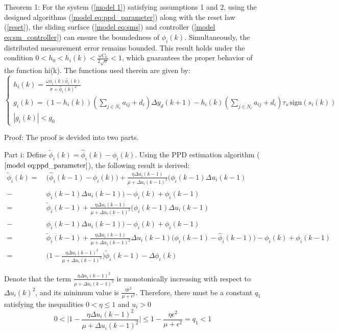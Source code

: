 \documentclass[journal,onecolumn]{IEEEtran}
\begin{document}
Theorem 1: For the system (\ref{model 1}) satisfying assumptions 1 and 2, using  the designed algorithms (\ref{model eq:ppd_parameter}) along with the reset law (\ref{reset}), the sliding surface (\ref{model eq:sms}) and controller (\ref{model eq:sm_controller}) can ensure the boundedness of $ \hat{\phi}_i(k) $. Simultaneously, the distributed measurement error remains bounded. This result holds under the condition $ 0<h_0<h_i(k)<\frac{\omega C_0}{2 \sqrt{\sigma}} <1  $, which guarantees the proper behavior of the function hi(k). The functions used therein are given by: 
\[
\begin{cases} 
    h_i(k) = \frac{\omega \phi_i(k) \hat{\phi}_i(k)}{\sigma + \hat{\phi}_i(k)^2} \\
    g_i(k) = (1 - h_i(k))\left( \sum_{j \in N_i} a_{ij} + d_i \right)\Delta y_d(k+1) - h_i(k)\left( \sum_{j \in N_i} a_{ij} + d_i \right)\tau_s\, \text{sign}(s_i(k)) \\
    |g_i(k)| < g_0
\end{cases}
\]

Proof: The proof is devided into two parts.

Part i: Define $\tilde{\phi}_i(k) = \hat{\phi}_i(k) - \phi_i(k)$. Using the PPD estimation algorithm ($\ref{model eq:ppd_parameter}$), the following result is derived:
\begin{align}
    \label{model:phi_tilde_update}
    \tilde{\phi}_i(k) = \ & \big( \hat{\phi}_i(k-1) - \phi_i(k) \big) + \frac{\eta \Delta u_i(k-1)}{\mu + \Delta u_i(k-1)^2} \big( \phi_i(k-1) \Delta u_i(k-1) \quad \nonumber \\
    - \ & \hat{\phi}_i(k-1) \Delta u_i(k-1)\big) - \phi_i(k) + \phi_i(k-1) \quad \nonumber \\
    = \ & \tilde{\phi}_i(k-1) + \frac{\eta \Delta u_i(k-1)}{\mu + \Delta u_i(k-1)^2} \big( \phi_i(k-1) \Delta u_i(k-1) \quad \nonumber \\
    - \ & \hat{\phi}_i(k-1) \Delta u_i(k-1)\big) - \phi_i(k) + \phi_i(k-1) \quad \nonumber \\
    = \ & \tilde{\phi}_i(k-1) + \frac{\eta \Delta u_i(k-1)}{\mu + \Delta u_i(k-1)^2} \Delta u_i(k-1) \big( \phi_i(k-1) - \hat{\phi}_i(k-1) \big) - \phi_i(k) + \phi_i(k-1) \quad \nonumber \\
    = \ & \bigg( 1 - \frac{\eta \Delta u_i(k-1)^2}{\mu + \Delta u_i(k-1)^2} \bigg) \tilde{\phi}_i(k-1) - \Delta \phi_i(k)
\end{align}


Denote that the term $ \frac{\eta \Delta u_i(k-1)^2}{\mu + \Delta u_i(k-1)^2} $ is monotonically increasing with respect to $ \Delta u_i(k)^2 $, and its minimum value is $ \frac{\eta \epsilon^2}{\mu + \epsilon^2} $. Therefore, there must be a constant $ q_1 $ satisfying the inequalities $ 0 < \eta \leq 1 $ and $ u_i > 0$
\begin{equation}
    \label{model eq:ineq}
    0 < \bigg |1 - \frac{\eta \Delta u_i(k-1)^2}{\mu + \Delta u_i(k-1)^2} \bigg| \leq 1 - \frac{\eta \epsilon^2}{\mu + \epsilon^2} = q_1 < 1 
\end{equation}
\end{document}
